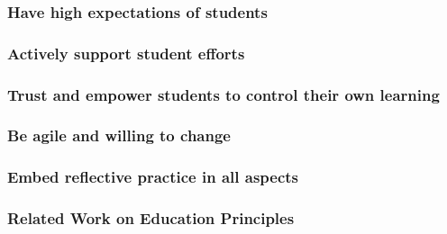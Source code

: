 \subsubsection{Have high expectations of students} %
\label{ssub:have_high_expectations_of_students_}


\subsubsection{Actively support student efforts} %
\label{ssub:actively_support_student_efforts}


\subsubsection{Trust and empower students to control their own learning} %
\label{ssub:trust_and_empower_students_to_control_their_own_learning}


\subsubsection{Be agile and willing to change} %
\label{ssub:be_agile_and_willing_to_change}


\subsubsection{Embed reflective practice in all aspects} %
\label{ssub:embed_reflective_practice_in_all_aspects}






\subsubsection{Related Work on Education Principles} %
\label{ssub:related_work_on_education_principles}




